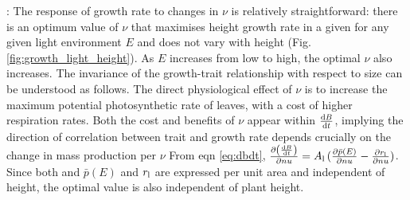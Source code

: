 \documentclass[a4paper,11pt]{article}
\begin{document}

: The response of growth rate to changes in $\nu$ is relatively straightforward: there is an optimum value of $\nu$ that maximises height growth rate in a given for any given light environment $E$ and does not vary with height (Fig. \ref{fig:growth_light_height}). As $E$ increases from low to high, the optimal $\nu$ also increases. The invariance of the growth-trait relationship with respect to size can be understood as follows. The direct physiological effect of $\nu$ is to increase the maximum potential photosynthetic rate of leaves, with a cost of higher respiration rates. Both the cost and benefits of $\nu$ appear within $\frac{ {\rm d}B} {{\rm d}t}$, implying the direction of correlation between trait and growth rate depends crucially on the change in mass production per $\nu$
From eqn \ref{eq:dbdt}, $\frac{\partial \left( \frac{ {\rm d}B} {{\rm d}t}\right)}{\partial nu} = A_{\rm l} \, (\frac{ \partial \bar{p}(E)}{\partial nu}  - \frac{ \partial r_{\rm l}}{\partial nu} )$. Since both and $\bar{p}(E)$ and $r_{\rm l}$ are expressed per unit area and independent of height, the optimal value is also independent of plant height.
\end{document}
